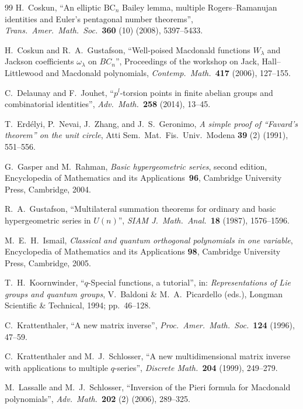 \documentclass[reqno,12pt]{amsart}
\theoremstyle{remark}
\numberwithin{equation}{section}
\newcommand{\la}{\lambda}
\begin{document}
\begin{thebibliography}{99}
 H.\ Coskun,
``An elliptic $\mathrm{BC}_n$ {B}ailey lemma, multiple
{R}ogers--{R}amanujan identities and {E}uler's pentagonal number theorems'',
\textit{Trans.\ Amer.\ Math.\ Soc.\ }\textbf{360} (10) (2008), 5397--5433.

 H.~Coskun and R.~A.~Gustafson,
``Well-poised {M}acdonald functions $W_\la$ and {J}ackson coefficients
$\omega_\la$ on $BC_n$'',
Proceedings of the workshop on
Jack, Hall--Littlewood and Macdonald polynomials,
{\em Contemp.\ Math.\ }\textbf{417} (2006), 127--155.

 C.\ Delaunay and F.\ Jouhet,
``$p^l$-torsion points in ﬁnite abelian groups and
combinatorial identities'',
{\em Adv.\ Math.\ }\textbf{258} (2014), 13--45.

 T.\ Erd\'elyi, P.\ Nevai, J.\ Zhang, and J.\ S.\ Geronimo,
{\em A simple proof of ``Favard's theorem'' on the unit circle},
Atti Sem.\ Mat.\ Fis.\ Univ.\ Modena \textbf{39} (2) (1991), 551--556.

 G.~Gasper and M.~Rahman,
{\em Basic hypergeometric series}, second edition,
Encyclopedia of Mathematics and its Applications~\textbf{96},
Cambridge University Press, Cambridge, 2004.

 R.\ A.\ Gustafson,
``Multilateral summation theorems for ordinary and basic
hypergeometric series in $U(n)$'',
{\em SIAM J.\ Math.\ Anal.\ }\textbf{18} (1987), 1576--1596.

 M.~E.~H.~Ismail,
{\em Classical and quantum orthogonal polynomials in one variable},
Encyclopedia of Mathematics and its Applications \textbf{98},
Cambridge University Press, Cambridge, 2005.

 T.~H.~Koornwinder,
``$q$-Special functions, a tutorial'',
in: {\em Representations of Lie groups and quantum groups},
V.~Baldoni \& M.~A.~Picardello (eds.),
Longman Scientific \& Technical, 1994; pp.~46--128.

 C.~Krattenthaler,
``A new matrix inverse'',
{\em Proc.\ Amer.\ Math.\ Soc.\ }\textbf{124} (1996), 47--59.
  
 C.~Krattenthaler and M.~J.~Schlosser,
``A new multidimensional matrix inverse with applications to multiple
$q$-series'',
{\em Discrete Math.\ }\textbf{204} (1999), 249--279.

 M.\ Lassalle and M.~J.~Schlosser,
``Inversion of the Pieri formula for Macdonald polynomials'',
{\em Adv.\ Math.\ }\textbf{202} (2) (2006), 289--325.


\end{thebibliography}
\end{document}
